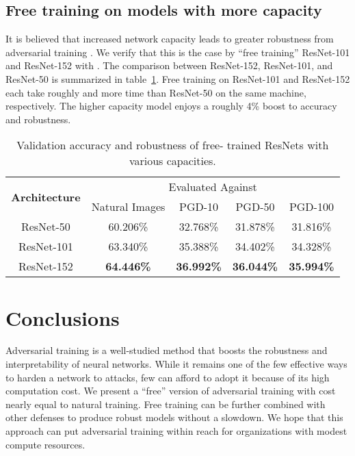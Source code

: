 \documentclass{article}
\begin{document}
\subsection*{Free training on models with more capacity}
It is believed that increased network capacity leads to greater robustness from adversarial training \citep{madry2017towards, kurakin2016adversarial}. We  verify that this is the case by ``free training'' ResNet-101 and ResNet-152 with . The comparison between ResNet-152, ResNet-101, and ResNet-50 is summarized in table~\ref{tab:101_vs_50}. Free training on ResNet-101 and ResNet-152 each take roughly  and  more time than ResNet-50 on the same machine, respectively. The higher capacity model enjoys a roughly 4\% boost to accuracy and robustness.

\begin{table}
    \centering
    \caption{Validation accuracy and robustness of free- trained ResNets with various capacities.
    } 
    \begin{tabular}{|c||c|c|c|c|}
    \hline
    
     \multirow{2}{*}{\textbf{Architecture}} & \multicolumn{4}{c|}{ Evaluated Against} \\ \cline{2-5} & Natural Images & PGD-10 & PGD-50 & PGD-100 \\ 
    \hline\hline
    ResNet-50 & 60.206\% & 32.768\% & 31.878\%& 31.816\%\\
    \hline
    ResNet-101 & 63.340\% & 35.388\% & 34.402\%& 34.328\%\\
    \hline
    ResNet-152 & \textbf{64.446\%} & \textbf{36.992\%} & \textbf{36.044\%}& \textbf{35.994\%}\\
    \hline
    \end{tabular}
    \label{tab:101_vs_50}
\end{table}

\section{Conclusions}
Adversarial training is a well-studied method that boosts the robustness and interpretability of neural networks. While it remains one of the few effective ways to harden a network to attacks, few can afford to adopt it because of its high computation cost. We present a ``free'' version of adversarial training with cost nearly equal to natural training. Free training can be further combined with other defenses to produce robust models without a slowdown. We hope that this approach can put adversarial training within reach for organizations with modest compute resources.
\end{document}
